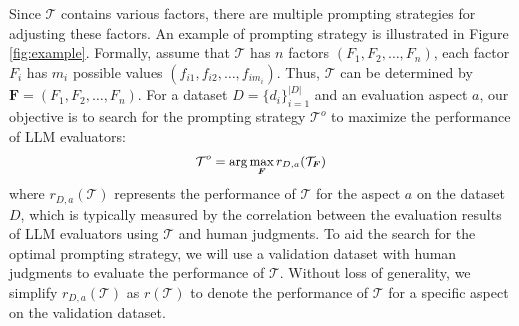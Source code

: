 Since $ \mathcal{T} $ contains various factors, there are multiple prompting strategies for adjusting these factors.
An example of prompting strategy is illustrated in Figure \ref{fig:example}.
Formally, assume that $ \mathcal{T} $ has $ n $ factors $ (F_1, F_2, \ldots, F_n ) $, each factor $ F_{i} $ has $ m_i $ possible values $ (f_{i1}, f_{i2}, \ldots, f_{im_i} ) $. 
Thus, $ \mathcal{T} $ can be determined by $ \boldsymbol{F} = (F_1, F_2, \ldots, F_n) $.
For a dataset $ D=\{d_i\}_{i=1}^{|D|} $ 
and an evaluation aspect $ a $, 
our objective is to search for the prompting strategy $\mathcal{T}^{o}$ to maximize the performance of LLM evaluators:
\begin{equation}
\small
\begin{aligned}
\mathcal{T}^{o} = \arg\max_{\boldsymbol{F}} r_{D,a}(\mathcal{T}_{\boldsymbol{F}})
\end{aligned}
\end{equation}
where 
$ r_{D,a}(\mathcal{T}) $ represents the performance of $ \mathcal{T} $ for the aspect $ a $ on the dataset $ D $,  which is typically measured by the correlation between the evaluation results of LLM evaluators using $ \mathcal{T} $ and human judgments.
To aid the search for the optimal prompting strategy, we will use a validation dataset with human judgments to evaluate the performance of $ \mathcal{T} $.
Without loss of generality, we simplify $ r_{D,a}(\mathcal{T}) $ as $ r(\mathcal{T}) $ to denote the performance of $\mathcal{T}$ for a specific aspect on the validation dataset.


